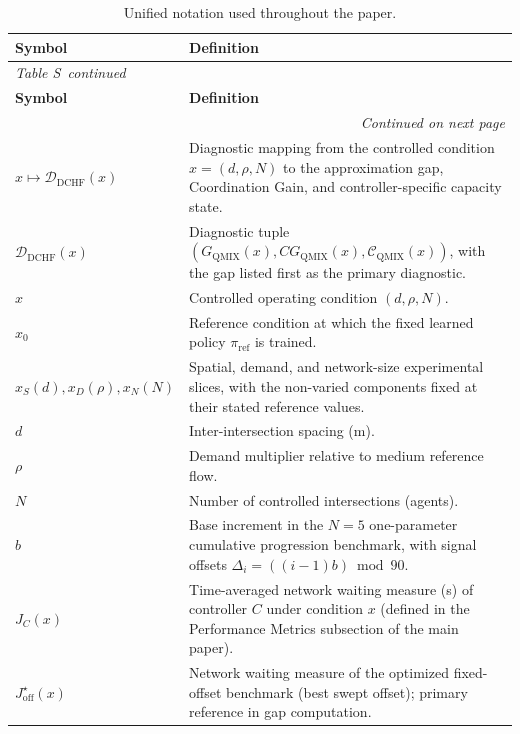 \documentclass[12pt]{article}
\renewcommand{\thetable}{S\arabic{table}}
\newcommand{\suppsec}[1]{%
  \bigskip\par\noindent{\large\bfseries #1}\par\medskip}
\begin{document}
\suppsec{S-7\quad Notation}

\begin{longtable}{p{3.8cm}p{11.4cm}}
\caption{Unified notation used throughout the paper.}
\label{tab:notation}\\
\toprule
\textbf{Symbol} & \textbf{Definition} \\
\midrule
\endfirsthead
\multicolumn{2}{l}{\small\textit{Table \thetable\ continued}}\\
\toprule
\textbf{Symbol} & \textbf{Definition} \\
\midrule
\endhead
\midrule
\multicolumn{2}{r}{\small\textit{Continued on next page}}\\
\endfoot
\bottomrule
\endlastfoot
$x\mapsto\mathcal{D}_{\mathrm{DCHF}}(x)$ & Diagnostic mapping from the controlled condition $x=(d,\rho,N)$ to the approximation gap, Coordination Gain, and controller-specific capacity state. \\
$\mathcal{D}_{\mathrm{DCHF}}(x)$ & Diagnostic tuple $(G_{\mathrm{QMIX}}(x), CG_{\mathrm{QMIX}}(x), \mathcal{C}_{\mathrm{QMIX}}(x))$, with the gap listed first as the primary diagnostic. \\
$x$ & Controlled operating condition $(d,\rho,N)$. \\
$x_0$ & Reference condition at which the fixed learned policy $\pi_{\mathrm{ref}}$ is trained. \\
$x_S(d),x_D(\rho),x_N(N)$ & Spatial, demand, and network-size experimental slices, with the non-varied components fixed at their stated reference values. \\
$d$ & Inter-intersection spacing (m). \\
$\rho$ & Demand multiplier relative to medium reference flow. \\
$N$ & Number of controlled intersections (agents). \\
$b$ & Base increment in the $N=5$ one-parameter cumulative progression benchmark, with signal offsets $\Delta_i=((i-1)b)\bmod90$. \\
$J_C(x)$ & Time-averaged network waiting measure (s) of controller $C$ under condition $x$ (defined in the Performance Metrics subsection of the main paper). \\
$J_{\mathrm{off}}^{\star}(x)$ & Network waiting measure of the optimized fixed-offset benchmark (best swept offset); primary reference in gap computation. \\

\end{longtable}
\end{document}
